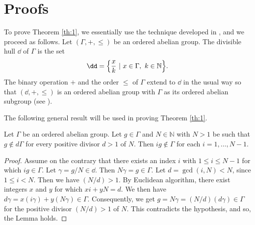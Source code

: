 \documentclass[12pt]{amsart}%
\begin{document}
\section{Proofs}
To prove Theorem \ref{th:1}, we essentially use the technique developed in \cite{JK}, and we proceed as follows. Let $(\Gamma,+,\leq)$ be an ordered abelian group. The divisible hull $\dd$ of $\Gamma$ is the set
 \begin{eqnarray*}
 \dd=\Bigl\{\frac{x}{k}~|~x\in \Gamma,~k\in \mathbb{N}\Bigr\}.
 \end{eqnarray*}
 The binary operation $+$ and the order $\leq$ of $\Gamma$ extend to $\dd$ in the usual way so that $(\dd, +, \leq)$ is an ordered abelian group with $\Gamma$ as its ordered abelian subgroup (see \cite{Fuchs1970}).

The following general result will be used in proving Theorem \ref{th:1}.
\begin{lemma}\label{LL1}
    Let $\Gamma$ be an ordered abelian group. Let $g\in \Gamma$ and $N\in \mathbb{N}$ with $N>1$ be such that $g\not\in d \Gamma$ for every positive divisor $d>1$ of $N$. Then $ig\not\in \Gamma$ for each $i=1,\ldots, N-1$.
\end{lemma}
\begin{proof} Assume on the contrary that there exists an index $i$ with $1\leq i\leq N-1$ for which $ig\in \Gamma$. Let $\gamma=g/N\in \dd$. Then $N\gamma=g\in \Gamma$. Let $d=\gcd(i,N)<N$, since $1\leq i<N$. Then we have $(N/d)>1$. By Euclidean algorithm, there exist integers $x$ and $y$ for which $xi+yN=d$. We then have $d\gamma=x(i\gamma)+y(N\gamma)\in \Gamma$. Consequently, we get $g=N\gamma=(N/d)(d\gamma) \in \Gamma$ for the positive divisor $(N/d)>1$ of $N$. This contradicts the hypothesis, and so, the Lemma holds.
\end{proof}
\end{document}
